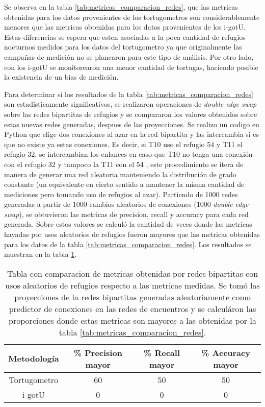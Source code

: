 Se observa en la tabla \ref{tab:metricas_comparacion_redes}, que las metricas obtenidas para los datos provenientes de los tortugometros son considerablemente menores que las metricas obtenidas para los datos provenientes de los i-gotU. Estas diferencias se espera que esten asociadas a la poca cantidad de refugios nocturnos medidos para los datos del tortugometro ya que originalmente las campañas de medición no se planearon para este tipo de análisis. Por otro lado, con los i-gotU se monitorearon una menor cantidad de tortugas, haciendo posible la existencia de un bias de medición. 

Para determinar si los resultados de la tabla \ref{tab:metricas_comparacion_redes} son estadísticamente significativos, se realizaron operaciones de \textit{double edge swap} sobre las redes bipartitas de refugios y se compararon los valores obtenidos sobre estas nuevas redes generadas, despues de las proyecciones. Se realizo un codigo en Python que elige dos conexiones al azar en la red bipartita y las intercambia si es que no existe ya estas conexiones. Es decir, si T10 uso el refugio 54 y T11 el refugio 32, se intercambian los enlances en caso que T10 no tenga una conexión con el refugio 32 y tampoco la T11 con el 54 \cite{github}, este procedimiento se itera de manera de generar una red aleatoria manteniendo la distribución de grado constante (un equivalente en cierto sentido a mantener la misma cantidad de mediciones pero tomando uso de refugios al azar). Partiendo de 1000 redes generadas a partir de 1000 cambios aleatorios de conexiones (1000 \textit{double edge swap}), se obtuvieron las metricas de precision, recall y accuracy para cada red generada. Sobre estos valores se calculó la cantidad de veces donde las metricas hayadas por usos aleatorios de refugios fueron mayores que las metricas obtenidas para los datos de la tabla \ref{tab:metricas_comparacion_redes}. Los resultados se muestran en la tabla \ref{tab:metricas_comparacion_redes_aleatorias}.
\begin{table}[ht]
    \centering
    \begin{tabular}{|c|c|c|c|}
        
   \hline
    Metodología  & \% Precision mayor  &  \% Recall mayor & \% Accuracy mayor \\ \hline
    Tortugometro & 60    & 50  & 50    \\ \hline
    i-gotU       & 0        & 0    & 0      \\ \hline
    
    \end{tabular}
    \caption[Tabla con comparacion de metricas obtenidas en redes bipartitas con usos aleatorios de refugios respecto a las metricas medidas.]{Tabla con comparacion de metricas obtenidas por redes bipartitas con usos aleatorios de refugios respecto a las metricas medidas. Se tomó las proyecciones de la redes bipartitas generadas aleatoriamente como predictor de conexiones en las redes de encuentros y se calculáron las proporciones donde estas metricas son mayores a las obtenidas por la tabla \ref{tab:metricas_comparacion_redes}.}
    \label{tab:metricas_comparacion_redes_aleatorias}
\end{table}
